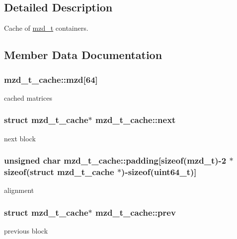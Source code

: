 \subsection{Detailed Description}
Cache of \hyperlink{structmzd__t}{mzd\+\_\+t} containers. 

\subsection{Member Data Documentation}
\hypertarget{structmzd__t__cache_a2ecb1f99e88c241041f5736702f7ed54}{}
\subsubsection[{mzd}]{ mzd\+\_\+t\+\_\+cache\+::mzd\mbox{[}64\mbox{]}}\label{structmzd__t__cache_a2ecb1f99e88c241041f5736702f7ed54}
cached matrices \hypertarget{structmzd__t__cache_afbe21f2087b595ae7aa22e500b36e570}{}
\subsubsection[{next}]{\setlength{\rightskip}{0pt plus 5cm}struct {\bf mzd\+\_\+t\+\_\+cache}$\ast$ mzd\+\_\+t\+\_\+cache\+::next}\label{structmzd__t__cache_afbe21f2087b595ae7aa22e500b36e570}
next block \hypertarget{structmzd__t__cache_a1c7ca8f1b754eff42424287003ae8351}{}
\subsubsection[{padding}]{\setlength{\rightskip}{0pt plus 5cm}unsigned char mzd\+\_\+t\+\_\+cache\+::padding\mbox{[}sizeof({\bf mzd\+\_\+t})-\/2 $\ast$sizeof(struct {\bf mzd\+\_\+t\+\_\+cache} $\ast$)-\/sizeof(uint64\+\_\+t)\mbox{]}}\label{structmzd__t__cache_a1c7ca8f1b754eff42424287003ae8351}
alignment \hypertarget{structmzd__t__cache_af03b3b89df5ea816faeb98633c29ade7}{}
\subsubsection[{prev}]{\setlength{\rightskip}{0pt plus 5cm}struct {\bf mzd\+\_\+t\+\_\+cache}$\ast$ mzd\+\_\+t\+\_\+cache\+::prev}\label{structmzd__t__cache_af03b3b89df5ea816faeb98633c29ade7}
previous block \hypertarget{structmzd__t__cache_a06d198f654e655c6c59801676aa1bd39}{}
